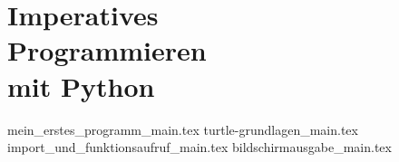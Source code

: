 
\part[Imperatives Programmieren mit Python]{Imperatives \\ Programmieren \\ mit Python}
\label{part-programmieren-mit-python}

{mein_erstes_programm_main.tex}
{turtle-grundlagen_main.tex}
{import_und_funktionsaufruf_main.tex}
{bildschirmausgabe_main.tex}

